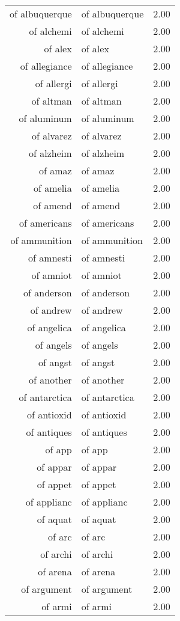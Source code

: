 \begin{table}[ht]
\begin{tabular}{rlr}
  of albuquerque & of albuquerque & 2.00 \\ 
  of alchemi & of alchemi & 2.00 \\ 
  of alex & of alex & 2.00 \\ 
  of allegiance & of allegiance & 2.00 \\ 
  of allergi & of allergi & 2.00 \\ 
  of altman & of altman & 2.00 \\ 
  of aluminum & of aluminum & 2.00 \\ 
  of alvarez & of alvarez & 2.00 \\ 
  of alzheim & of alzheim & 2.00 \\ 
  of amaz & of amaz & 2.00 \\ 
  of amelia & of amelia & 2.00 \\ 
  of amend & of amend & 2.00 \\ 
  of americans & of americans & 2.00 \\ 
  of ammunition & of ammunition & 2.00 \\ 
  of amnesti & of amnesti & 2.00 \\ 
  of amniot & of amniot & 2.00 \\ 
  of anderson & of anderson & 2.00 \\ 
  of andrew & of andrew & 2.00 \\ 
  of angelica & of angelica & 2.00 \\ 
  of angels & of angels & 2.00 \\ 
  of angst & of angst & 2.00 \\ 
  of another & of another & 2.00 \\ 
  of antarctica & of antarctica & 2.00 \\ 
  of antioxid & of antioxid & 2.00 \\ 
  of antiques & of antiques & 2.00 \\ 
  of app & of app & 2.00 \\ 
  of appar & of appar & 2.00 \\ 
  of appet & of appet & 2.00 \\ 
  of applianc & of applianc & 2.00 \\ 
  of aquat & of aquat & 2.00 \\ 
  of arc & of arc & 2.00 \\ 
  of archi & of archi & 2.00 \\ 
  of arena & of arena & 2.00 \\ 
  of argument & of argument & 2.00 \\ 
  of armi & of armi & 2.00 \\ 

\end{tabular}
\end{table}
